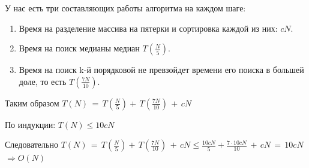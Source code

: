 \Proof У нас есть три составляющих работы алгоритма на каждом шаге:
\begin{enumerate}
    \item Время на разделение массива на пятерки и сортировка каждой из них: $cN$.
    \item Время на поиск медианы медиан $T(\frac{N}{5})$.
    \item Время на поиск k-й порядковой не превзойдет времени его поиска в большей доле, то есть $T(\frac{7N}{10})$.
\end{enumerate}

Таким образом $T(N)\,=\,T(\frac{N}{5})+\,T(\frac{7N}{10})\,+\,cN$

По индукции: $T(N) \leq 10cN$

Следовательно $T(N)\,=\,T(\frac{N}{5})+\,T(\frac{7N}{10})\,+\,cN \leq \frac{10cN}{5} +\frac{7 \cdot 10cN}{10}\,+\,cN\,=\,10cN$ $\Rightarrow O(N)$
\Endproof

\pagebreak